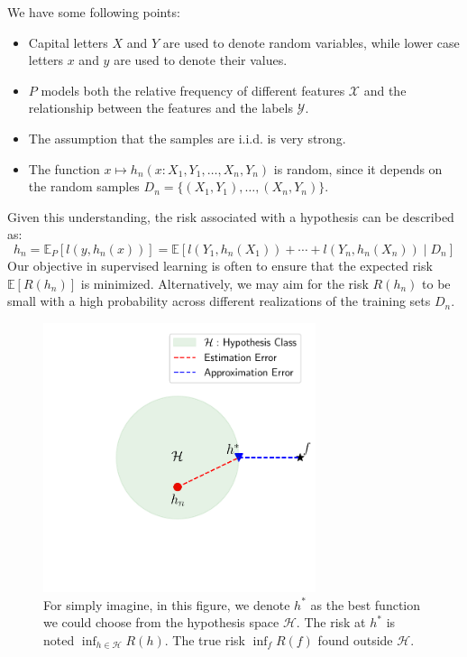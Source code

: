 \documentclass[11pt]{article}
\begin{document}
    \begin{remark}
        We have some following points:
        \begin{itemize}
            \item Capital letters $X$ and $Y$ are used to denote random variables, while lower case letters $x$ and $y$ are used to denote their values.
            \item $P$ models both the relative frequency of different features $\mathcal{X}$ and the relationship between the features and the labels $\mathcal{Y}$.
            \item The assumption that the samples are i.i.d. is very strong.
            \item The function \(x \mapsto h_n(x : X_1, Y_1, \dots, X_n, Y_n)\) is random, since it depends on the random samples \(D_n = \{(X_1, Y_1), \dots, (X_n, Y_n)\}\).
        \end{itemize}
    \end{remark}

    Given this understanding, the risk associated with a hypothesis can be described as:
    \begin{equation}
        h_n = \mathbb{E}_{P}[l(y, h_n(x))] = \mathbb{E}[l(Y_1, h_n(X_1)) + \cdots + l(Y_n, h_n(X_n)) \mid D_n]
    \end{equation}
    Our objective in supervised learning is often to ensure that the expected risk $\mathbb{E}[R(h_n)]$ is minimized. Alternatively, we may aim for the risk $R(h_n)$ to be small with a high probability across different realizations of the training sets $D_n$.

    \begin{figure}[h]
        \centering
        \includegraphics[trim=0.5cm 3cm 0.2cm 0.5cm, clip, width=8cm]{figures/fig1.1.pdf}
        \caption{For simply imagine, in this figure, we denote $h^*$ as the best function we could choose from the hypothesis space $\mathcal{H}$. The risk at $h^*$ is noted $\inf_{h \in \mathcal{H}} R(h)$. The true risk $\inf_{f} R(f)$ found outside $\mathcal{H}$.}
        \label{fig:risk_class}
    \end{figure}
\end{document}
